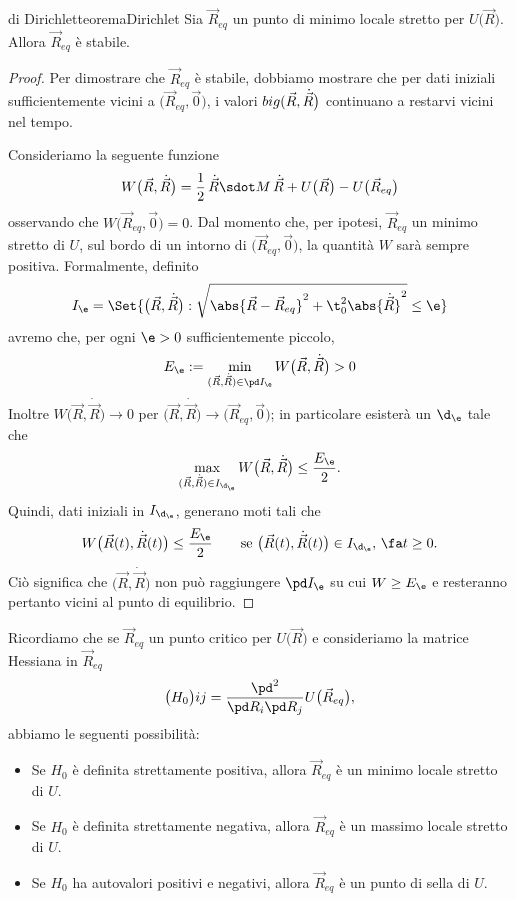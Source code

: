\begin{teor}{di Dirichlet}{teoremaDirichlet}
	Sia \(\vec{R}_{eq}\) un punto di minimo locale stretto per \(U\big(\vec{R}\big)\).
	Allora \(\vec{R}_{eq}\) è stabile.
\end{teor}
%
%
\begin{proof}
	Per dimostrare che \(\vec{R}_{eq}\) è stabile, dobbiamo mostrare che per dati iniziali sufficientemente vicini a \(\big(\vec{R}_{eq},\vec{0}\big)\), i valori \(\\big(\vec{R},\dot{\vec{R}}\big)\) continuano a restarvi vicini nel tempo.
	
	Consideriamo la seguente funzione
	\[
		W\big(\vec{R},\dot{\vec{R}}\big) = \frac{1}{2}\,\dot{\vec{R}}\sdot M\,\dot{\vec{R}} + U\big(\vec{R}\big) - U\big(\vec{R}_{eq}\big)
	\]
	osservando che \(W\big(\vec{R}_{eq},\vec{0}\big)=0\).
	Dal momento che, per ipotesi, \(\vec{R}_{eq}\) un minimo stretto di \(U\), sul bordo di un intorno di \(\big(\vec{R}_{eq},\vec{0}\big)\), la quantità \(W\) sarà sempre positiva. Formalmente, definito
	\[
		I_\e = \Set{\big(\vec{R},\dot{\vec{R}}\big) : \sqrt{\abs{\vec{R}-\vec{R}_{eq}}^2+\t_0^2\abs{\dot{\vec{R}}}^2} \le \e}
	\]
	avremo che, per ogni \(\e>0\) sufficientemente piccolo,
	\[
		E_\e:=\min_{(\vec{R},\dot{\vec{R}}) \in \pd I_\e} W\big(\vec{R},\dot{\vec{R}}\big) > 0
	\]
	Inoltre \(W\big(\vec{R},\dot{\vec{R}}\big) \to 0\) per \(\big(\vec{R},\dot{\vec{R}}\big) \to \big(\vec{R}_{eq},\vec{0}\big)\); in particolare esisterà un \(\d_\e\) tale che
	\[
		\max_{(\vec{R},\dot{\vec{R}})\in I_{\d_\e}} W\big(\vec{R},\dot{\vec{R}}\big) \le \frac{E_\e}{2}.
	\]
	Quindi, dati iniziali in \(I_{\d_\e}\), generano moti tali che
	\[
		W\big(\vec{R}(t),\dot{\vec{R}}(t)\big) \le \frac{E_\e}{2} \qquad\text{se }\big(\vec{R}(t),\dot{\vec{R}}(t)\big) \in I_{\d_\e},\,\fa t \ge 0.
	\]
	Ciò significa che \(\big(\vec{R},\dot{\vec{R}}\big)\) non può raggiungere \(\pd I_\e\) su cui \(W \ge E_\e\) e resteranno pertanto vicini al punto di equilibrio.
\end{proof}

\begin{oss}
	Ricordiamo che se \(\vec{R}_{eq}\) un punto critico per \(U\big(\vec{R}\big)\) e consideriamo la matrice Hessiana in \(\vec{R}_{eq}\)
	\[
		\big(H_0\big){i j} = \frac{\pd^2}{\pd R_i \pd R_j}U\big(\vec{R}_{eq}\big),
	\]
	abbiamo le seguenti possibilità:
	\begin{itemize}
		\item Se \(H_0\) è definita strettamente positiva, allora \(\vec{R}_{eq}\) è un minimo locale stretto di \(U\).
		\item Se \(H_0\) è definita strettamente negativa, allora \(\vec{R}_{eq}\) è un massimo locale stretto di \(U\).
		\item Se \(H_0\) ha autovalori positivi e negativi, allora \(\vec{R}_{eq}\) è un punto di sella di \(U\).
	\end{itemize}
\end{oss}

